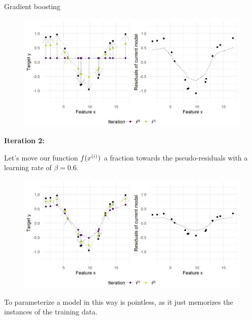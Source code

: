 \begin{vbframe}{Gradient boosting}
\begin{figure}
  \includegraphics[width=\textwidth]{figure/fig-gb-concept-pseudo-resi-1.png}
\end{figure}

\framebreak

\textbf{Iteration 2:}

Let's move our function $f(x^{(i)})$ a fraction towards the pseudo-residuals with a learning rate of $\beta = 0.6$.


\begin{figure}
  \includegraphics[width=\textwidth]{figure/fig-gb-concept-pseudo-resi-2.png}
\end{figure}

\framebreak
\begin{footnotesize}




To parameterize a model in this way is pointless,
as it just memorizes the instances of the training data.


\end{footnotesize}
\end{vbframe}
